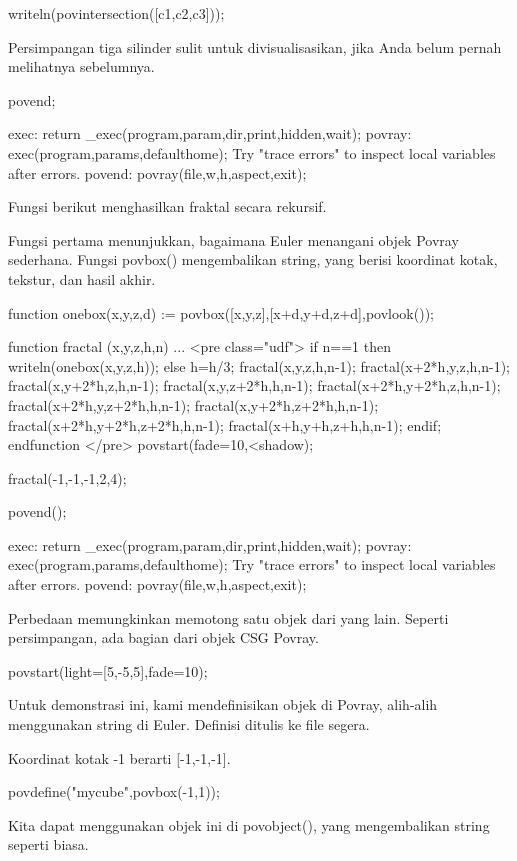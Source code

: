 \documentclass{article}
\begin{document}
\>writeln(povintersection([c1,c2,c3]));


Persimpangan tiga silinder sulit untuk divisualisasikan, jika Anda
belum pernah melihatnya sebelumnya.


\>povend;


    exec:
        return _exec(program,param,dir,print,hidden,wait);
    povray:
        exec(program,params,defaulthome);
    Try "trace errors" to inspect local variables after errors.
    povend:
        povray(file,w,h,aspect,exit); 

Fungsi berikut menghasilkan fraktal secara rekursif.


Fungsi pertama menunjukkan, bagaimana Euler menangani objek Povray
sederhana. Fungsi povbox() mengembalikan string, yang berisi koordinat
kotak, tekstur, dan hasil akhir.


\>function onebox(x,y,z,d) := povbox([x,y,z],[x+d,y+d,z+d],povlook());

\>function fractal (x,y,z,h,n) ...  
\>  
<pre class="udf">     if n==1 then writeln(onebox(x,y,z,h));
     else
       h=h/3;
       fractal(x,y,z,h,n-1);
       fractal(x+2*h,y,z,h,n-1);
       fractal(x,y+2*h,z,h,n-1);
       fractal(x,y,z+2*h,h,n-1);
       fractal(x+2*h,y+2*h,z,h,n-1);
       fractal(x+2*h,y,z+2*h,h,n-1);
       fractal(x,y+2*h,z+2*h,h,n-1);
       fractal(x+2*h,y+2*h,z+2*h,h,n-1);
       fractal(x+h,y+h,z+h,h,n-1);
     endif;
    endfunction
</pre>
\>povstart(fade=10,<shadow);

\>fractal(-1,-1,-1,2,4);

\>povend();


    exec:
        return _exec(program,param,dir,print,hidden,wait);
    povray:
        exec(program,params,defaulthome);
    Try "trace errors" to inspect local variables after errors.
    povend:
        povray(file,w,h,aspect,exit); 

Perbedaan memungkinkan memotong satu objek dari yang lain. Seperti
persimpangan, ada bagian dari objek CSG Povray.


\>povstart(light=[5,-5,5],fade=10);


Untuk demonstrasi ini, kami mendefinisikan objek di Povray, alih-alih
menggunakan string di Euler. Definisi ditulis ke file segera.


Koordinat kotak -1 berarti [-1,-1,-1].


\>povdefine("mycube",povbox(-1,1));


Kita dapat menggunakan objek ini di povobject(), yang mengembalikan
string seperti biasa.
\end{document}
